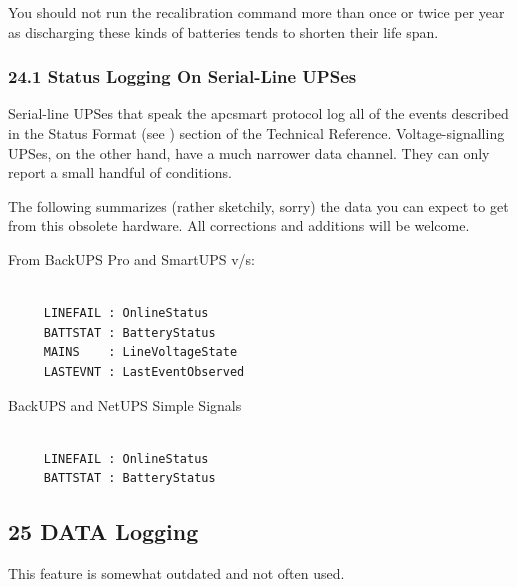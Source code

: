 {{{{{{{{{{You should not run the recalibration command more than once or twice per year
as discharging these kinds of batteries tends to shorten their life span. 

\label{Status-Logging-On-Serial_002dLine-UPSes}

\subsubsection*{24.1 Status Logging On Serial-Line UPSes}

Serial-line UPSes that speak the apcsmart protocol log all of the events
described in the Status Format (see 
) section of
the Technical Reference.  Voltage-signalling UPSes, on the other hand, have a
much narrower data channel.  They can only report a small handful of
conditions.  

The following summarizes (rather sketchily, sorry) the data you can expect to
get from this obsolete hardware.  All corrections and additions will be
welcome.  

From BackUPS Pro and SmartUPS v/s: 

\footnotesize
\begin{verbatim}
     
     LINEFAIL : OnlineStatus
     BATTSTAT : BatteryStatus
     MAINS    : LineVoltageState
     LASTEVNT : LastEventObserved
\end{verbatim}
\normalsize

BackUPS and NetUPS Simple Signals 

\footnotesize
\begin{verbatim}
     
     LINEFAIL : OnlineStatus
     BATTSTAT : BatteryStatus
\end{verbatim}
\normalsize

\label{DATA-Logging}

\subsection*{25 DATA Logging}

\label{index-Logging_002c-DATA-233}
\label{index-DATA-Logging-234}
This feature is somewhat outdated and not often used.  

}}}}}}}}}}

